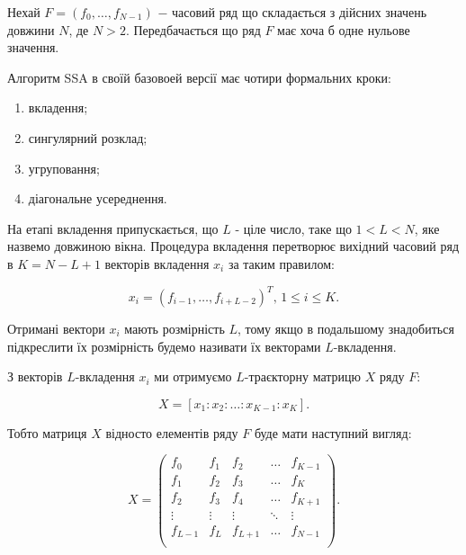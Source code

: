 Нехай $F = (f_{0}, \dots, f_{N-1})$ $-$ часовий ряд що складається з дійсних значень довжини $N$, де $N > 2$. Передбачається що ряд $F$ має хоча б одне нульове значення.

Алгоритм SSA в своїй базовоей версії має чотири формальних кроки: 

\begin{enumerate}
	\item вкладення; 
	\item сингулярний розклад;
	\item угруповання;
	\item діагональне усереднення. 
\end{enumerate}	

На етапі вкладення припускається, що $L$ - ціле число, таке що $1 < L < N$, яке назвемо довжиною вікна. Процедура вкладення перетворює вихідний часовий ряд в $K = N - L + 1$ векторів вкладення $x_{i}$ за таким правилом:

\begin{equation}
x_{i} = (f_{i-1}, \dots, f_{i+L-2})^{T}, \, 1 \le i \le K.
\end{equation}

\vspace{1.5em}

Отримані вектори $x_{i}$ мають розмірність $L$, тому якщо в подальшому знадобиться підкреслити їх розмірність будемо називати їх векторами $L$-вкладення.

З векторів $L$-вкладення $x_{i}$ ми отримуємо $L$-траєкторну матрицю $X$ ряду $F$:

\begin{equation}
X = [x_{1} : x_{2} : \dots : x_{K-1} : x_{K}].
\end{equation}

\vspace{1.5em}

Тобто матриця $X$ відносто елементів ряду $F$ буде мати наступний вигляд:

\begin{equation}\label{eq:traekt}
X = \left(\begin{array}{ccccc} 
f_{0} & f_{1} & f_{2} & \dots & f_{K-1} \\
f_{1} & f_{2} & f_{3} & \dots & f_{K} \\
f_{2} & f_{3} & f_{4} & \dots & f_{K+1} \\
\vdots & \vdots & \vdots & \ddots & \vdots \\
f_{L-1} & f_{L} & f_{L+1} & \dots & f_{N-1} \\
\end{array}\right).
\end{equation}

